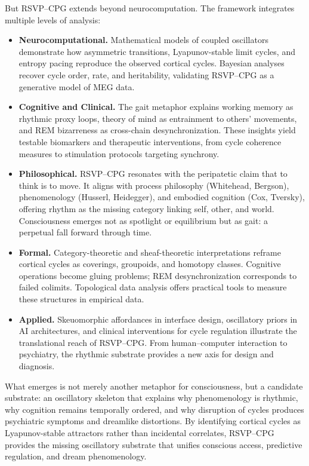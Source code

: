 \documentclass{article}
\begin{document}
But RSVP--CPG extends beyond neurocomputation. The framework integrates multiple levels of analysis:

\begin{itemize}[noitemsep,topsep=0pt]
\item \textbf{Neurocomputational.} Mathematical models of coupled oscillators demonstrate how asymmetric transitions, Lyapunov-stable limit cycles, and entropy pacing reproduce the observed cortical cycles. Bayesian analyses recover cycle order, rate, and heritability, validating RSVP--CPG as a generative model of MEG data.
\item \textbf{Cognitive and Clinical.} The gait metaphor explains working memory as rhythmic proxy loops, theory of mind as entrainment to others’ movements, and REM bizarreness as cross-chain desynchronization. These insights yield testable biomarkers and therapeutic interventions, from cycle coherence measures to stimulation protocols targeting synchrony.
\item \textbf{Philosophical.} RSVP--CPG resonates with the peripatetic claim that to think is to move. It aligns with process philosophy (Whitehead, Bergson), phenomenology (Husserl, Heidegger), and embodied cognition (Cox, Tversky), offering rhythm as the missing category linking self, other, and world. Consciousness emerges not as spotlight or equilibrium but as gait: a perpetual fall forward through time.
\item \textbf{Formal.} Category-theoretic and sheaf-theoretic interpretations reframe cortical cycles as coverings, groupoids, and homotopy classes. Cognitive operations become gluing problems; REM desynchronization corresponds to failed colimits. Topological data analysis offers practical tools to measure these structures in empirical data.
\item \textbf{Applied.} Skeuomorphic affordances in interface design, oscillatory priors in AI architectures, and clinical interventions for cycle regulation illustrate the translational reach of RSVP--CPG. From human–computer interaction to psychiatry, the rhythmic substrate provides a new axis for design and diagnosis.
\end{itemize}

What emerges is not merely another metaphor for consciousness, but a candidate substrate: an oscillatory skeleton that explains why phenomenology is rhythmic, why cognition remains temporally ordered, and why disruption of cycles produces psychiatric symptoms and dreamlike distortions. By identifying cortical cycles as Lyapunov-stable attractors rather than incidental correlates, RSVP--CPG provides the missing oscillatory substrate that unifies conscious access, predictive regulation, and dream phenomenology.
\end{document}

